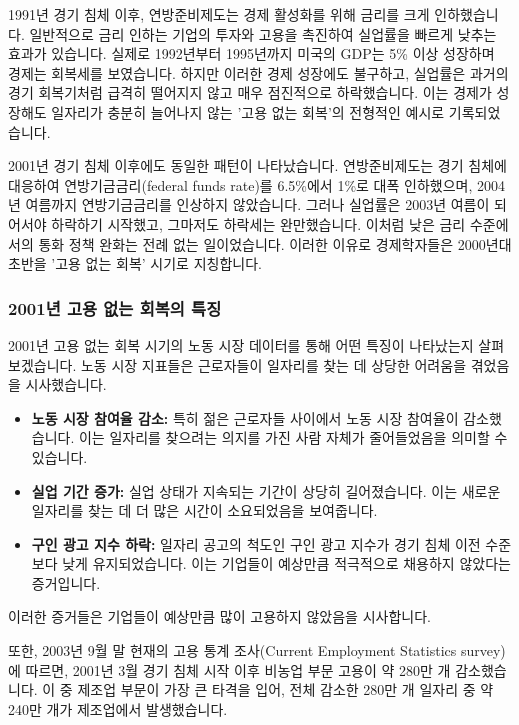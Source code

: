 \documentclass[11pt,a4paper]{book}
\theoremstyle{definition}
\begin{document}
\begin{examplebox}[title={1991년 경기 침체 후 고용 없는 회복}]
1991년 경기 침체 이후, 연방준비제도는 경제 활성화를 위해 금리를 크게 인하했습니다. 일반적으로 금리 인하는 기업의 투자와 고용을 촉진하여 실업률을 빠르게 낮추는 효과가 있습니다. 실제로 1992년부터 1995년까지 미국의 GDP는 5\% 이상 성장하며 경제는 회복세를 보였습니다. 하지만 이러한 경제 성장에도 불구하고, 실업률은 과거의 경기 회복기처럼 급격히 떨어지지 않고 매우 점진적으로 하락했습니다. 이는 경제가 성장해도 일자리가 충분히 늘어나지 않는 '고용 없는 회복'의 전형적인 예시로 기록되었습니다.
\end{examplebox}

2001년 경기 침체 이후에도 동일한 패턴이 나타났습니다. 연방준비제도는 경기 침체에 대응하여 연방기금금리(federal funds rate)를 6.5\%에서 1\%로 대폭 인하했으며, 2004년 여름까지 연방기금금리를 인상하지 않았습니다. 그러나 실업률은 2003년 여름이 되어서야 하락하기 시작했고, 그마저도 하락세는 완만했습니다. 이처럼 낮은 금리 수준에서의 통화 정책 완화는 전례 없는 일이었습니다. 이러한 이유로 경제학자들은 2000년대 초반을 '고용 없는 회복' 시기로 지칭합니다.

\subsubsection{2001년 고용 없는 회복의 특징}
2001년 고용 없는 회복 시기의 노동 시장 데이터를 통해 어떤 특징이 나타났는지 살펴보겠습니다. 노동 시장 지표들은 근로자들이 일자리를 찾는 데 상당한 어려움을 겪었음을 시사했습니다.

\begin{itemize}
    \item \textbf{노동 시장 참여율 감소:} 특히 젊은 근로자들 사이에서 노동 시장 참여율이 감소했습니다. 이는 일자리를 찾으려는 의지를 가진 사람 자체가 줄어들었음을 의미할 수 있습니다.
    \item \textbf{실업 기간 증가:} 실업 상태가 지속되는 기간이 상당히 길어졌습니다. 이는 새로운 일자리를 찾는 데 더 많은 시간이 소요되었음을 보여줍니다.
    \item \textbf{구인 광고 지수 하락:} 일자리 공고의 척도인 구인 광고 지수가 경기 침체 이전 수준보다 낮게 유지되었습니다. 이는 기업들이 예상만큼 적극적으로 채용하지 않았다는 증거입니다.
\end{itemize}
이러한 증거들은 기업들이 예상만큼 많이 고용하지 않았음을 시사합니다.

또한, 2003년 9월 말 현재의 고용 통계 조사(Current Employment Statistics survey)에 따르면, 2001년 3월 경기 침체 시작 이후 비농업 부문 고용이 약 280만 개 감소했습니다. 이 중 제조업 부문이 가장 큰 타격을 입어, 전체 감소한 280만 개 일자리 중 약 240만 개가 제조업에서 발생했습니다.
\end{document}
